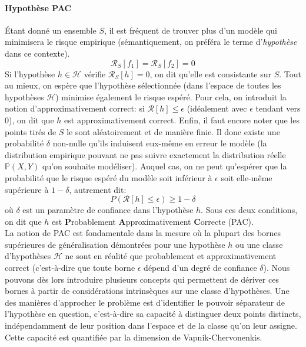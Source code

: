\paragraph{Hypothèse PAC}
Étant donné un ensemble $S$, il est fréquent de trouver plus d'un modèle qui minimisera le risque empirique (sémantiquement, on préféra le terme d'\textit{hypothèse} dans ce contexte).
\begin{equation}
	\mathcal{R}_S[f_1] = \mathcal{R}_S[f_2] = 0
\end{equation}
Si l'hypothèse $h \in \mathcal{H}$ vérifie $\mathcal{R}_S[h]=0$, on dit qu'elle est consistante sur $S$.
Tout au mieux, on espère que l'hypothèse sélectionnée (dans l'espace de toutes les hypothèses $\mathcal{H}$) minimise également le risque espéré. Pour cela, on introduit la notion d'approximativement correct: si $\mathcal{R}[h] \leq \epsilon$ (idéalement avec $\epsilon$ tendant vers 0), on dit que $h$ est approximativement correct. Enfin, il faut encore noter que les points tirés de $S$ le sont aléatoirement et de manière finie. Il donc existe une probabilité $\delta$ non-nulle qu'ils induisent eux-même en erreur le modèle (la distribution empirique pouvant ne pas suivre exactement la distribution réelle $\mathbb{P}(X, Y)$ qu'on souhaite modéliser).
Auquel cas, on ne peut qu'espérer que la probabilité que le risque espéré du modèle soit inférieur à $\epsilon$ soit elle-même supérieure à $1-\delta$, autrement dit:
\begin{equation}
	P(\mathcal{R}[h] \leq \epsilon) \geq 1 - \delta
\end{equation}
où $\delta$ est un paramètre de confiance dans l'hypothèse $h$. Sous ces deux conditions, on dit que $h$ est \textbf{P}robablement \textbf{A}pproximativement \textbf{C}orrecte (PAC). 
\\
La notion de PAC est fondamentale dans la mesure où la plupart des bornes supérieures de généralisation démontrées pour une hypothèse $h$ ou une classe d'hypothèses $\mathcal{H}$ ne sont en réalité que probablement et approximativement correct (c'est-à-dire que toute borne $\epsilon$ dépend d'un degré de confiance $\delta$). Nous pouvons dès lors introduire plusieurs concepts qui permettent de dériver ces bornes à partir de considérations intrinsèques sur une classe d'hypothèses. Une des manières d'approcher le problème est d'identifier le pouvoir séparateur de l'hypothèse en question, c'est-à-dire sa capacité à distinguer deux points distincts, indépendamment de leur position dans l'espace et de la classe qu'on leur assigne. Cette capacité est quantifiée par la dimension de Vapnik-Chervonenkis.
 
